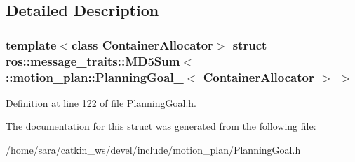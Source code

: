 \subsection{Detailed Description}
\subsubsection*{template$<$class Container\+Allocator$>$\newline
struct ros\+::message\+\_\+traits\+::\+M\+D5\+Sum$<$ \+::motion\+\_\+plan\+::\+Planning\+Goal\+\_\+$<$ Container\+Allocator $>$ $>$}



Definition at line 122 of file Planning\+Goal.\+h.



The documentation for this struct was generated from the following file\+:\begin{DoxyCompactItemize}
\item 
/home/sara/catkin\+\_\+ws/devel/include/motion\+\_\+plan/Planning\+Goal.\+h\end{DoxyCompactItemize}
